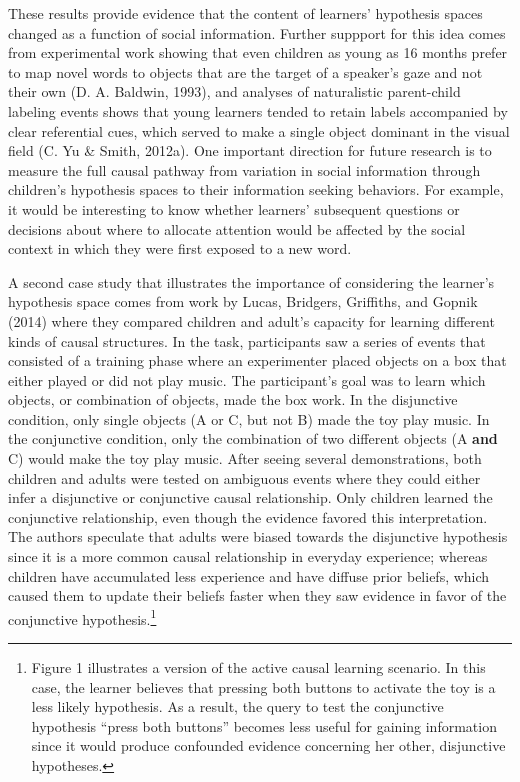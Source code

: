 \documentclass[english,floatsintext,man]{apa6}
\newcounter{author}
\theoremstyle{definition}
\theoremstyle{definition}
\theoremstyle{definition}
\theoremstyle{remark}
\begin{document}
These results provide evidence that the content of learners' hypothesis
spaces changed as a function of social information. Further suppport for
this idea comes from experimental work showing that even children as
young as 16 months prefer to map novel words to objects that are the
target of a speaker's gaze and not their own (D. A. Baldwin, 1993), and
analyses of naturalistic parent-child labeling events shows that young
learners tended to retain labels accompanied by clear referential cues,
which served to make a single object dominant in the visual field (C. Yu
\& Smith, 2012a). One important direction for future research is to
measure the full causal pathway from variation in social information
through children's hypothesis spaces to their information seeking
behaviors. For example, it would be interesting to know whether
learners' subsequent questions or decisions about where to allocate
attention would be affected by the social context in which they were
first exposed to a new word.

A second case study that illustrates the importance of considering the
learner's hypothesis space comes from work by Lucas, Bridgers,
Griffiths, and Gopnik (2014) where they compared children and adult's
capacity for learning different kinds of causal structures. In the task,
participants saw a series of events that consisted of a training phase
where an experimenter placed objects on a box that either played or did
not play music. The participant's goal was to learn which objects, or
combination of objects, made the box work. In the disjunctive condition,
only single objects (A or C, but not B) made the toy play music. In the
conjunctive condition, only the combination of two different objects (A
\textbf{and} C) would make the toy play music. After seeing several
demonstrations, both children and adults were tested on ambiguous events
where they could either infer a disjunctive or conjunctive causal
relationship. Only children learned the conjunctive relationship, even
though the evidence favored this interpretation. The authors speculate
that adults were biased towards the disjunctive hypothesis since it is a
more common causal relationship in everyday experience; whereas children
have accumulated less experience and have diffuse prior beliefs, which
caused them to update their beliefs faster when they saw evidence in
favor of the conjunctive hypothesis.\footnote{Figure 1 illustrates a
  version of the active causal learning scenario. In this case, the
  learner believes that pressing both buttons to activate the toy is a
  less likely hypothesis. As a result, the query to test the conjunctive
  hypothesis \enquote{press both buttons} becomes less useful for
  gaining information since it would produce confounded evidence
  concerning her other, disjunctive hypotheses.}
\end{document}
